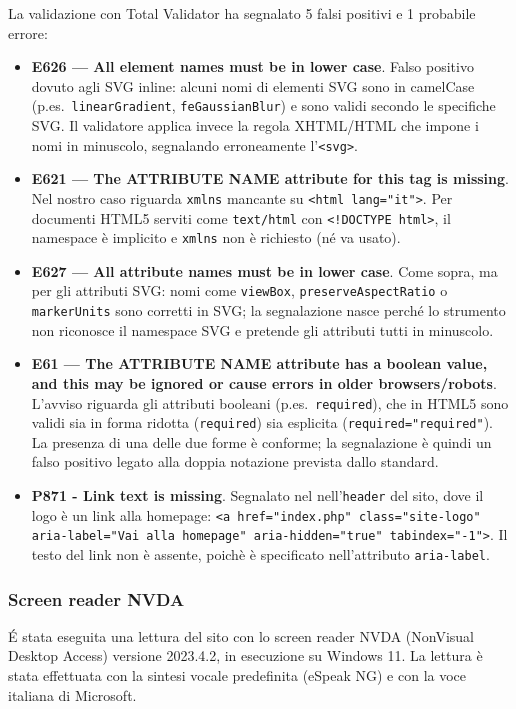 La validazione con Total Validator ha segnalato 5 falsi positivi e 1 probabile errore:
\begin{itemize}
  \item \textbf{E626 — All element names must be in lower case}. Falso positivo dovuto agli SVG inline: alcuni nomi di elementi SVG sono in camelCase (p.es.\ \texttt{linearGradient}, \texttt{feGaussianBlur}) e sono validi secondo le specifiche SVG. Il validatore applica invece la regola XHTML/HTML che impone i nomi in minuscolo, segnalando erroneamente l’\verb|<svg>|.
\item \textbf{E621 — The ATTRIBUTE NAME attribute for this tag is missing}. Nel nostro caso riguarda \texttt{xmlns} mancante su \verb|<html lang="it">|. Per documenti HTML5 serviti come \texttt{text/html} con \verb|<!DOCTYPE html>|, il namespace è implicito e \texttt{xmlns} non è richiesto (né va usato).
  \item \textbf{E627 — All attribute names must be in lower case}. Come sopra, ma per gli attributi SVG: nomi come \texttt{viewBox}, \texttt{preserveAspectRatio} o \texttt{markerUnits} sono corretti in SVG; la segnalazione nasce perché lo strumento non riconosce il namespace SVG e pretende gli attributi tutti in minuscolo.
  \item \textbf{E61 — The ATTRIBUTE NAME attribute has a boolean value, and this may be ignored or cause errors in older browsers/robots}. L’avviso riguarda gli attributi booleani (p.es.\ \texttt{required}), che in HTML5 sono validi sia in forma ridotta (\texttt{required}) sia esplicita (\texttt{required="required"}). La presenza di una delle due forme è conforme; la segnalazione è quindi un falso positivo legato alla doppia notazione prevista dallo standard.
  \item \textbf{P871 - Link text is missing}. Segnalato nel nell'\texttt{header} del sito, dove il logo è un link alla homepage: \texttt{<a href="index.php" class="site-logo" aria-label="Vai alla homepage" aria-hidden="true" tabindex="-1">}. Il testo del link non è assente, poichè è specificato nell’attributo \texttt{aria-label}.
\end{itemize}

\subsubsection{Screen reader NVDA}

É stata eseguita una lettura del sito con lo screen reader NVDA (NonVisual Desktop Access) versione 2023.4.2, in esecuzione su Windows 11. La lettura è stata effettuata con la sintesi vocale predefinita (eSpeak NG) e con la voce italiana di Microsoft.

